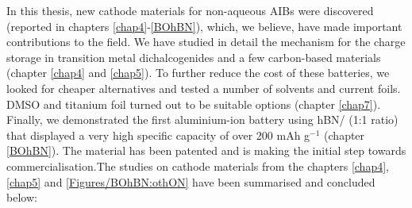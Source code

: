 In this thesis, new cathode materials for non-aqueous AIBs were discovered (reported in chapters \ref{chap4}-\ref{BOhBN}), which, we believe, have made important contributions to the field. We have studied in detail the mechanism for the charge storage in transition metal dichalcogenides and a few carbon-based materials (chapter \ref{chap4} and \ref{chap5}). To further reduce the cost of these batteries, we looked for cheaper alternatives and tested a number of solvents and current foils. DMSO and titanium foil turned out to be suitable options (chapter \ref{chap7}). Finally, we demonstrated the first aluminium-ion battery using hBN/ (1:1 ratio) that displayed a very high specific capacity  of over 200 mAh g$^{-1}$ (chapter \ref{BOhBN}). The material has been patented and is making the initial step towards commercialisation.The studies on cathode materials from the chapters \ref{chap4}, \ref{chap5} and \ref{Figures/BOhBN:othON} have been summarised and concluded below:\\
